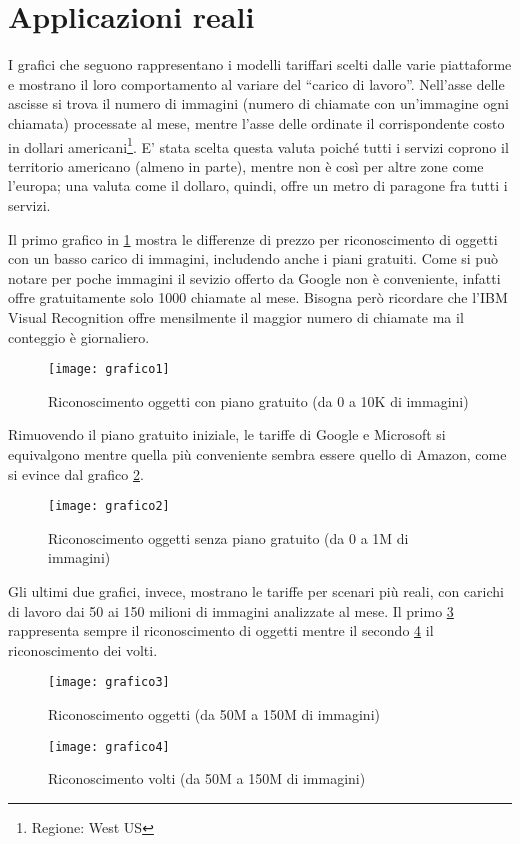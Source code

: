 \section{Applicazioni reali}
I grafici che seguono rappresentano i modelli tariffari scelti dalle varie piattaforme e mostrano il loro comportamento al variare del ``carico di lavoro''.
Nell'asse delle ascisse si trova il numero di immagini (numero di chiamate con un'immagine ogni chiamata) processate al mese,
mentre l'asse delle ordinate il corrispondente costo in dollari americani\footnote{Regione: West US}.
E' stata scelta questa valuta poiché tutti i servizi coprono il territorio americano (almeno in parte), mentre non è così per altre zone come l'europa;
una valuta come il dollaro, quindi, offre un metro di paragone fra tutti i servizi.

Il primo grafico in \ref{grafico-1} mostra le differenze di prezzo per riconoscimento di oggetti con un basso carico di immagini, includendo anche i piani gratuiti.
Come si può notare per poche immagini il sevizio offerto da Google non è conveniente, infatti offre gratuitamente solo 1000 chiamate al mese. 
Bisogna però ricordare che l'IBM Visual Recognition offre mensilmente il maggior numero di chiamate ma il conteggio è giornaliero. 
\begin{figure}[!h]
\begin{center}
	\texttt{[image: grafico1]} 
{\scriptsize \caption{Riconoscimento oggetti con piano gratuito (da 0 a 10K di immagini)}}
\label{grafico-1}
\end{center}
\end{figure}
%
%

Rimuovendo il piano gratuito iniziale, le tariffe di Google e Microsoft si equivalgono mentre quella più conveniente sembra essere quello di Amazon,
come si evince dal grafico \ref{grafico-2}.
\begin{figure}[!h]
\begin{center}
	\texttt{[image: grafico2]} 
{\scriptsize \caption{Riconoscimento oggetti senza piano gratuito (da 0 a 1M di immagini)}}
\label{grafico-2}
\end{center}
\end{figure}
%
%

Gli ultimi due grafici, invece, mostrano le tariffe per scenari più reali, con carichi di lavoro dai 50 ai 150 milioni di immagini analizzate al mese.
Il primo \ref{grafico-3} rappresenta sempre il riconoscimento di oggetti mentre il secondo \ref{grafico-4} il riconoscimento dei volti.
\begin{figure}[!h]
\begin{center}
	\texttt{[image: grafico3]} 
{\scriptsize \caption{Riconoscimento oggetti (da 50M a 150M di immagini)}}
\label{grafico-3}
\end{center}
\end{figure}
%
\begin{figure}[!h]
\begin{center}
	\texttt{[image: grafico4]} 
{\scriptsize \caption{Riconoscimento volti (da 50M a 150M di immagini)}}
\label{grafico-4}
\end{center}
\end{figure}